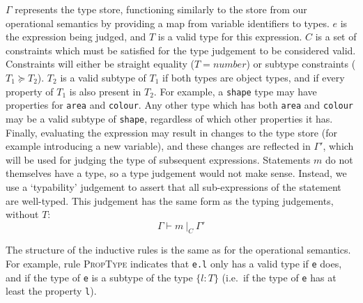\documentclass[12pt,a4paper,twoside,openright]{report}
\newcommand*{\js}{\texttt}
\begin{document}
$\Gamma$ represents the type store, functioning similarly to the store from our
operational semantics by providing a map from variable identifiers to types.
$e$ is the expression being judged, and $T$ is a valid type for this
expression. $C$ is a set of constraints which must be satisfied for the type
judgement to be considered valid. Constraints will either be straight equality
($T = number$) or subtype constraints ($T_1 \succeq T_2$). $T_2$ is a valid
subtype of $T_1$ if both types are object types, and if every property of $T_1$
is also present in $T_2$. For example, a \js{shape} type may have
properties for \js{area} and \js{colour}. Any other type which has both
\js{area} and \js{colour} may be a valid subtype of \js{shape},
regardless of which other properties it has. Finally, evaluating the expression
may result in changes to the type store (for example introducing a new
variable), and these changes are reflected in $\Gamma'$, which will be used for
judging the type of subsequent expressions. Statements $m$ do not themselves
have a type, so a type judgement would not make sense. Instead, we use a
`typability' judgement to assert that all sub-expressions of the statement are
well-typed.  This judgement has the same form as the typing judgements, without
$T$: 
$$\Gamma \vdash m\ |_C\ \Gamma'$$

The structure of the inductive rules is the same as for the operational
semantics. For example, rule \textsc{PropType} indicates that \js{e.l} only
has a valid type if \js{e} does, and if the type of \js{e} is a subtype
of the type $\{l: T\}$ (i.e.~if the type of \js{e} has at least the property
\js{l}).
\end{document}
